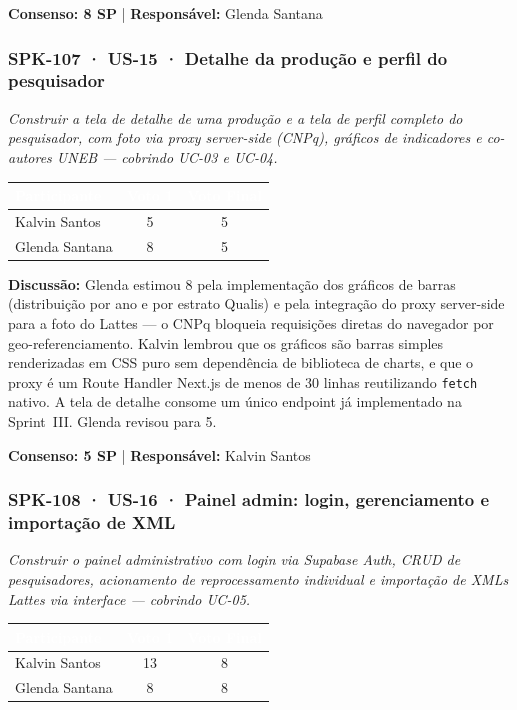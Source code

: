 \documentclass[12pt,a4paper]{article}
\begin{document}
\textbf{Consenso: 8 SP} \quad | \quad \textbf{Responsável:} Glenda Santana

\subsubsection{SPK-107 · US-15 · Detalhe da produção e perfil do pesquisador}

\textit{Construir a tela de detalhe de uma produção e a tela de perfil completo do pesquisador, com
foto via proxy server-side (CNPq), gráficos de indicadores e co-autores UNEB — cobrindo UC-03 e UC-04.}

\vspace{0.3cm}
\begin{tabular}{lcc}
  \toprule
  \rowcolor{sparkblue}
  \textcolor{white}{\textbf{Participante}} &
  \textcolor{white}{\textbf{Voto 1}} &
  \textcolor{white}{\textbf{Voto Final}} \\
  \midrule
  Kalvin Santos  & 5 & 5 \\
  Glenda Santana & 8 & 5 \\
  \bottomrule
\end{tabular}

\vspace{0.2cm}
\textbf{Discussão:} Glenda estimou 8 pela implementação dos gráficos de barras (distribuição por ano e
por estrato Qualis) e pela integração do proxy server-side para a foto do Lattes — o CNPq bloqueia
requisições diretas do navegador por geo-referenciamento. Kalvin lembrou que os gráficos são barras
simples renderizadas em CSS puro sem dependência de biblioteca de charts, e que o proxy é um Route Handler
Next.js de menos de 30 linhas reutilizando \texttt{fetch} nativo. A tela de detalhe consome um único
endpoint já implementado na Sprint~III. Glenda revisou para 5.

\textbf{Consenso: 5 SP} \quad | \quad \textbf{Responsável:} Kalvin Santos

\subsubsection{SPK-108 · US-16 · Painel admin: login, gerenciamento e importação de XML}

\textit{Construir o painel administrativo com login via Supabase Auth, CRUD de pesquisadores, acionamento
de reprocessamento individual e importação de XMLs Lattes via interface — cobrindo UC-05.}

\vspace{0.3cm}
\begin{tabular}{lcc}
  \toprule
  \rowcolor{sparkblue}
  \textcolor{white}{\textbf{Participante}} &
  \textcolor{white}{\textbf{Voto 1}} &
  \textcolor{white}{\textbf{Voto Final}} \\
  \midrule
  Kalvin Santos  & 13 & 8 \\
  Glenda Santana &  8 & 8 \\
  \bottomrule
\end{tabular}
\end{document}
